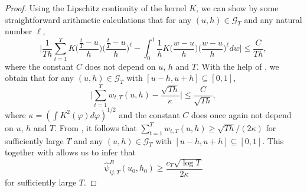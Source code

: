 \documentclass[a4paper,12pt]{article}
\makeatletter
\renewcommand{\eqref}[1]{\tagform@{\ref{#1}}}
\makeatother
\begin{document}
\begin{proof}
Using the Lipschitz continuity of the kernel $K$, we can show by some straightforward arithmetic calculations that for any $(u,h) \in \mathcal{G}_T$ and any natural number $\ell$, 
\begin{equation}\label{eq-riemann-sum}
\Big| \frac{1}{Th} \sum\limits_{t=1}^T K\Big(\frac{\frac{t}{T}-u}{h}\Big) \Big(\frac{\frac{t}{T}-u}{h}\Big)^\ell - \int_0^1 \frac{1}{h} K\Big(\frac{w-u}{h}\Big) \Big(\frac{w-u}{h}\Big)^\ell dw \Big| \le \frac{C}{Th}, 
\end{equation}
where the constant $C$ does not depend on $u$, $h$ and $T$. With the help of \eqref{eq-riemann-sum}, we obtain that for any $(u,h) \in \mathcal{G}_T$ with $[u-h,u+h] \subseteq [0,1]$, 
\begin{equation}\label{eq2-proof-prop-test-power}
\Big| \sum\limits_{t=1}^T w_{t,T}(u,h) - \frac{\sqrt{Th}}{\kappa} \Big| \le \frac{C}{\sqrt{Th}}, 
\end{equation}
where $\kappa = (\int K^2(\varphi)d\varphi)^{1/2}$ and the constant $C$ does once again not depend on $u$, $h$ and $T$. From \eqref{eq2-proof-prop-test-power}, it follows that $\sum\nolimits_{t=1}^T w_{t,T}(u,h) \ge \sqrt{Th} / (2\kappa)$ for sufficiently large $T$ and any $(u,h) \in \mathcal{G}_T$ with $[u-h,u+h] \subseteq [0,1]$. This together with \eqref{eq1-proof-prop-test-power} allows us to infer that 
\begin{equation}\label{eqA:power:psiB}
\widehat{\psi}_{ij, T}^B(u_0,h_0) \ge \frac{c_T \sqrt{\log T}}{2 \kappa} 
\end{equation}
for sufficiently large $T$. 


\end{proof}
\end{document}
